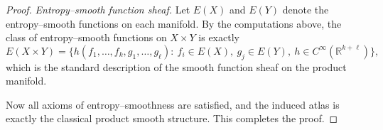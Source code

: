\documentclass[10pt,a4paper]{amsart}
\begin{document}
\begin{proof}
\medskip

\emph{Entropy–smooth function sheaf.}
Let $E(X)$ and $E(Y)$ denote the entropy–smooth functions on each manifold.
By the computations above, the class of entropy–smooth functions on $X\times Y$ is exactly
\[
E(X\times Y)=
\big\{
h(f_1,\dots,f_k,g_1,\dots,g_\ell)
:\ f_i\in E(X),\ g_j\in E(Y),\ h\in C^\infty(\mathbb{R}^{k+\ell})
\big\},
\]
which is the standard description of the smooth function sheaf on the product manifold.

Now all axioms of entropy–smoothness are satisfied, and the induced atlas is exactly the classical product smooth structure. This completes the proof.
\end{proof}
\end{document}
